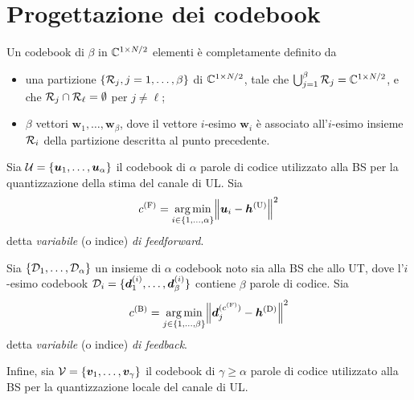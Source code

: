 \section{Progettazione dei codebook}

Un codebook di \(\beta\) in \(\mathbb{C}^{1 \times N/2}\) elementi è completamente
definito da
\begin{itemize}

    \item una partizione \(\{\mathcal{R}_j, j=1,\dots,\beta\}\) di
        \(\mathbb{C}^{1 \times N/2}\), tale che \(\bigcup_{j=1}^\beta \mathcal{R}_j = \mathbb{C}^{1
        \times N/2}\), e che \(\mathcal{R}_j \cap \mathcal{R}_\ell = \emptyset\) per
        \(j \neq \ell\);

    \item \(\beta\) vettori \(\bm{w}_1,\dots,\bm{w}_\beta\), dove il vettore
        \(i\)-esimo \(\bm{w}_i\) è associato all'\(i\)-esimo insieme
        \(\mathcal{R}_i\) della partizione descritta al punto precedente.

\end{itemize}

Sia \(\mathcal{U} = \{\bm{u}_1,\dots,\bm{u}_\alpha\}\) il codebook di \(\alpha\)
parole di codice utilizzato alla BS per la quantizzazione della stima del
canale di UL. Sia
\begin{equation}
    c^\mathrm{(F)} = \argmin_{i \in \{1,\dots,\alpha\}}
        \lnorm \bm{u}_i - \bm{h}^\mathrm{(U)} \rnorm^2
\end{equation}
detta \textit{variabile} (o indice) \textit{di feedforward}.

Sia \(\{\mathcal{D}_1,\dots,\mathcal{D}_\alpha\}\) un insieme di \(\alpha\) codebook
noto sia alla BS che allo UT, dove l'\(i\)-esimo codebook \(\mathcal{D}_i =
\{\bm{d}_1^{(i)},\dots,\bm{d}_\beta^{(i)}\}\) contiene \(\beta\) parole di
codice. Sia
\begin{equation}
    c^\mathrm{(B)} = \argmin_{j \in \{1,\dots,\beta\}}
        \lnorm \bm{d}_j^{(c^\mathrm{(F)})} - \bm{h}^\mathrm{(D)} \rnorm^2
\end{equation}
detta \textit{variabile} (o indice) \textit{di feedback}.

Infine, sia \(\mathcal{V} = \{\bm{v}_1,\dots,\bm{v}_\gamma\}\) il
codebook di \(\gamma \ge \alpha\) parole di codice utilizzato alla BS per la
quantizzazione locale del canale di UL.

